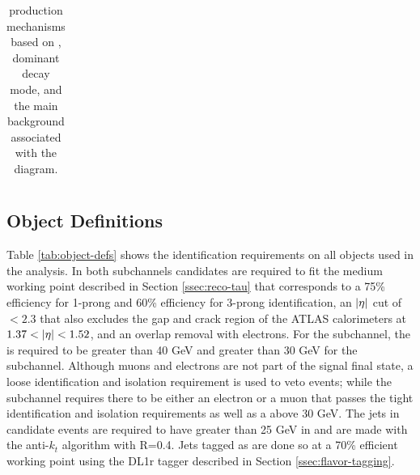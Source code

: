 \begin{table}[!thp]
{\begin{tabular}{| c | c | c | c |}
			\end{tabular}}
			\caption{\Hpm production mechanisms based on \mHpm, dominant \Hpm decay mode, and the main background associated with the diagram.}
			\label{tab:hplus-production}
		\end{table}

		\subsection{Object Definitions}\label{ssec:object-def}
			Table \ref{tab:object-defs} shows the identification requirements on all objects used in the analysis. In both subchannels \tauhad candidates are required to fit the medium working point described in Section \ref{ssec:reco-tau} that corresponds to a 75\% efficiency for 1-prong and 60\% efficiency for 3-prong \tauhad identification, an $|{\eta}|$ cut of $< 2.3$ that also excludes the gap and crack region of the ATLAS calorimeters at $1.37 < |{\eta}| < 1.52$, and an overlap removal with electrons. For the \taujets subchannel, the \tauhad \pt is required to be greater than 40 GeV and greater than 30 GeV for the \taulep subchannel. Although muons and electrons are not part of the \taujets signal final state, a loose identification and isolation requirement is used to veto events; while the \taulep subchannel requires there to be either an electron or a muon that passes the tight identification and isolation requirements as well as a \pt above 30 GeV. The jets in candidate events are required to have greater than 25 GeV in \pt and are made with the anti-$k_t$ algorithm with R=0.4. Jets tagged as \bjets are done so at a 70\% efficient working point using the DL1r tagger described in Section \ref{ssec:flavor-tagging}.

